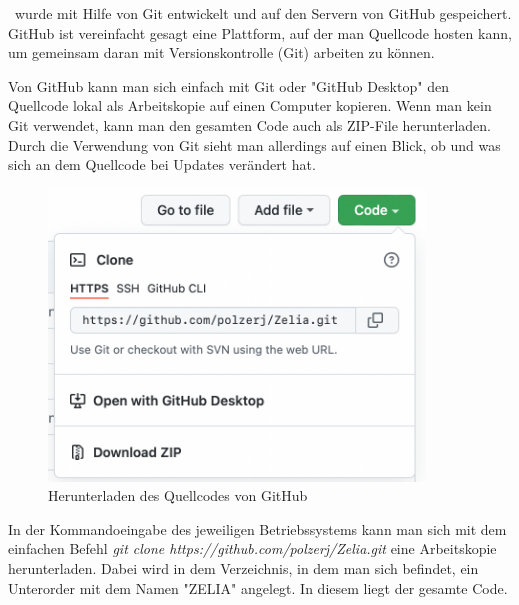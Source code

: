 
\ZELIA\ wurde mit Hilfe von Git entwickelt und auf den Servern von GitHub gespeichert. GitHub ist vereinfacht gesagt eine Plattform, auf der man Quellcode hosten kann, um gemeinsam daran mit Versionskontrolle (Git) arbeiten zu können. 

Von GitHub kann man sich einfach mit Git oder "GitHub Desktop" den Quellcode lokal als Arbeitskopie auf einen Computer kopieren. Wenn man kein Git verwendet, kann man den gesamten Code auch als ZIP-File herunterladen. Durch die Verwendung von Git sieht man allerdings auf einen Blick, ob und was sich an dem Quellcode bei Updates verändert hat.

\begin{figure}[H]
    \centering
    \includegraphics[width=100mm]{media/Handbuch/GitHub_Download.png}
    \caption{Herunterladen des Quellcodes von GitHub}
\end{figure}


In der Kommandoeingabe des jeweiligen Betriebssystems kann man sich mit dem einfachen Befehl \emph{git clone https://github.com/polzerj/Zelia.git} eine Arbeitskopie herunterladen. Dabei wird in dem Verzeichnis, in dem man sich befindet, ein Unterorder mit dem Namen "ZELIA" angelegt. In diesem liegt der gesamte Code.

